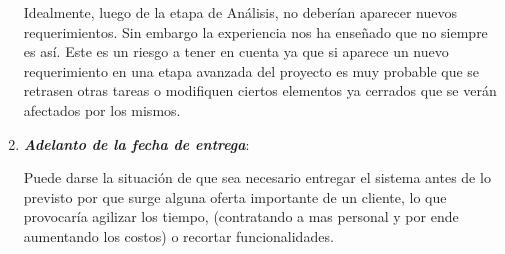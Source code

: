 \begin{enumerate}
Idealmente, luego de la etapa de Análisis, no deberían aparecer nuevos requerimientos. Sin embargo  la experiencia nos ha enseñado que no siempre es así. Este es un riesgo a tener en cuenta ya que si aparece un nuevo requerimiento en una etapa avanzada del proyecto es muy probable que se retrasen otras tareas o modifiquen ciertos elementos ya cerrados que se verán afectados por los mismos.

\item \textbf{\textit{Adelanto de la fecha de entrega}}:

Puede darse la situación de que sea necesario entregar el sistema antes de lo previsto por que surge alguna oferta importante de un cliente, lo que provocaría agilizar los tiempo, (contratando a mas personal y por ende aumentando los costos) o recortar funcionalidades.

\end{enumerate}
